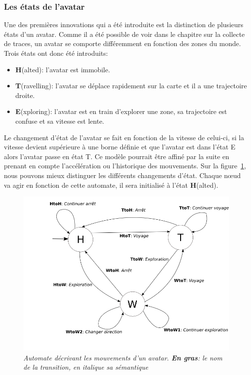 	\subsubsection{Les états de l'avatar}
	\label{Automate}
	Une des premières innovations qui a été introduite est la distinction de plusieurs états d'un avatar. Comme il a été possible de voir dans le chapitre sur la collecte de traces, un avatar se comporte différemment en fonction des zones du monde. Trois états ont donc été introduits:
	\begin{itemize}
	\renewcommand{\labelitemi}{$\bullet$}
		\item \textbf{H}(alted): l'avatar est immobile.
		\item \textbf{T}(ravelling): l'avatar se déplace rapidement sur la carte et il a une trajectoire droite.  
		\item \textbf{E}(xploring): l'avatar est en train d'explorer une zone, sa trajectoire est confuse et sa vitesse est lente.
	\end{itemize} 
	Le changement d'état de l'avatar se fait en fonction de la vitesse de celui-ci, si la vitesse devient supérieure à une borne définie et que l'avatar est dans l'état E alors l'avatar passe en état T. Ce modèle pourrait être affiné par la suite en prenant en compte l'accélération ou l'historique des mouvements. Sur la figure~\ref{automateMob}, nous pouvons mieux distinguer les différents changements d'état. Chaque nœud va agir en fonction de cette automate, il sera initialisé à l'état \textbf{H}(alted). \\
	

	\begin{figure}[!h]
        \centering
        \includegraphics[scale=0.4]{./Ressources/Images/automate.png}
        \caption{\textit{\small Automate décrivant les mouvements d'un avatar. \textbf{En gras}: le nom de la transition, en \textit{italique} sa sémantique}}
        \label{automateMob}
        \end{figure}




